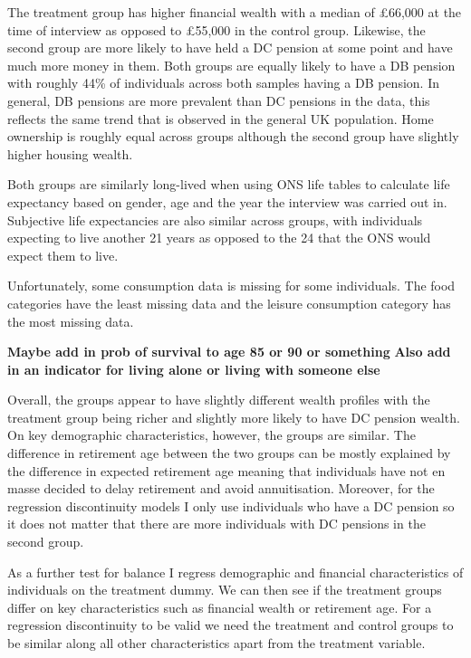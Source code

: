 \documentclass[12pt]{article}
\begin{document}
The treatment group has higher financial wealth with a median of £66,000 at the
time of interview as opposed to £55,000 in the control group. Likewise, the
second group are more likely to have held a DC pension at some point and have
much more money in them. Both groups are equally likely to have a DB pension
with roughly 44\% of individuals across both samples having a DB pension. In
general, DB pensions are more prevalent than DC pensions in the data, this
reflects the same trend that is observed in the general UK population. Home
ownership is roughly equal across groups although the second group have slightly
higher housing wealth.

Both groups are similarly long-lived when using ONS life tables to calculate
life expectancy based on gender, age and the year the interview was carried out
in. Subjective life expectancies are also similar across groups, with
individuals expecting to live another 21 years as opposed to the 24 that the ONS
would expect them to live.

Unfortunately, some consumption data is missing for some individuals. The food
categories have the least missing data and the leisure consumption category has
the most missing data.


\textbf{Maybe add in prob of survival to age 85 or 90 or something}
\textbf{Also add in an indicator for living alone or living with someone else}

Overall, the groups appear to have slightly different wealth profiles with the
treatment group being richer and slightly more likely to have DC pension wealth.
On key demographic characteristics, however, the groups are similar. The
difference in retirement age between the two groups can be mostly explained by
the difference in expected retirement age meaning that individuals have not en
masse decided to delay retirement and avoid annuitisation. Moreover, for the
regression discontinuity models I only use individuals who have a DC pension so
it does not matter that there are more individuals with DC pensions in the
second group.
\begin{landscape}
    \linespread{1.25}
    
    \normalsize
\end{landscape}


As a further test for balance I regress demographic and financial
characteristics of individuals on the treatment dummy. We can then see if the
treatment groups differ on key characteristics such as financial wealth or
retirement age. For a regression discontinuity to be valid we need the treatment
and control groups to be similar along all other characteristics apart from the
treatment variable.
\end{document}
